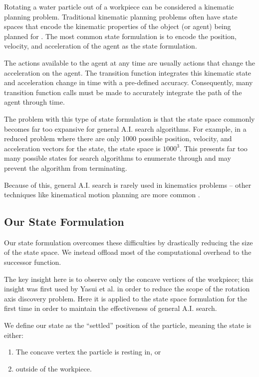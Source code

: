 Rotating a water particle out of a workpiece can be considered a kinematic planning problem. Traditional kinematic planning problems often have state spaces that encode the kinematic properties of the object (or agent) being planned for \cite{plot}. The most common state formulation is to encode the position, velocity, and acceleration of the agent as the state formulation.

The actions available to the agent at any time are usually actions that change the acceleration on the agent. The transition function integrates this kinematic state and acceleration change in time with a pre-defined accuracy. Consequently, many transition function calls must be made to accurately integrate the path of the agent through time.

The problem with this type of state formulation is that the state space commonly becomes far too expansive for general A.I. search algorithms. For example, in a reduced problem where there are only 1000 possible position, velocity, and acceleration vectors for the state, the state space is $1000^3$. This presents far too many possible states for search algorithms to enumerate through and may prevent the algorithm from terminating.

Because of this, general A.I. search is rarely used in kinematics problems -- other techniques like kinematical motion planning are more common \cite{plot}.

	\subsection{Our State Formulation}

Our state formulation overcomes these difficulties by drastically reducing the size of the state space. We instead offload most of the computational overhead to the successor function.

The key insight here is to observe only the concave vertices of the workpiece; this insight was first used by Yasui et al. \cite{plot} in order to reduce the scope of the rotation axis discovery problem. Here it is applied to the state space formulation for the first time in order to maintain the effectiveness of general A.I. search.

We define our state as the ``settled'' position of the particle, meaning the state is either:

\begin{enumerate}
\item The concave vertex the particle is resting in, or
\item outside of the workpiece.
\end{enumerate}

